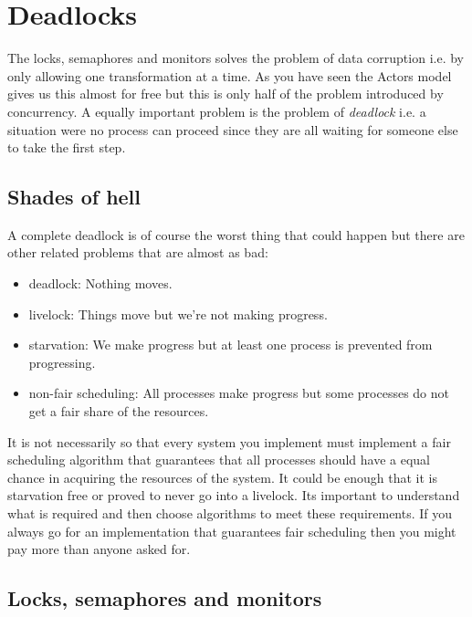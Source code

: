 \documentclass[a4paper,11pt]{article}
\begin{document}

\section{Deadlocks}

The locks, semaphores and monitors solves the problem of data
corruption i.e. by only allowing one transformation at a time. As you
have seen the Actors model gives us this almost for free but this is
only half of the problem introduced by concurrency. A equally important
problem is the problem of {\em deadlock} i.e. a situation were no
process can proceed since they are all waiting for someone else to
take the first step.


\subsection{Shades of hell}

A complete deadlock is of course the worst thing that could happen but
there are other related problems that are almost as bad:

\begin{itemize}
  \item deadlock: Nothing moves.
  \item livelock: Things move but we're not making progress.
  \item starvation: We make progress but at least one process is prevented from progressing.
  \item non-fair scheduling: All processes make progress but some processes do not get a fair share of the resources. 
\end{itemize}

It is not necessarily so that every system you implement must
implement a fair scheduling algorithm that guarantees that all
processes should have a equal chance in acquiring the resources of the
system. It could be enough that it is starvation free or proved to
never go into a livelock. Its important to understand what is required
and then choose algorithms to meet these requirements. If you always
go for an implementation that guarantees fair scheduling then you
might pay more than anyone asked for.


\subsection{Locks, semaphores and monitors}
\end{document}
